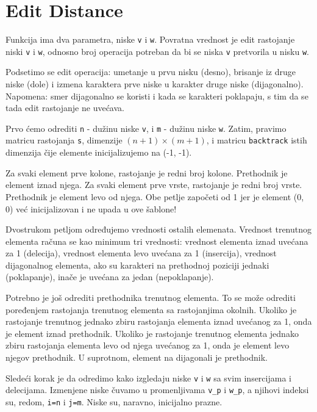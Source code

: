 \section{Edit Distance}

Funkcija ima dva parametra, niske \texttt{v} i \texttt{w}. Povratna vrednost je edit rastojanje niski \texttt{v} i \texttt{w}, odnosno broj operacija potreban da bi se niska \texttt{v} pretvorila u nisku \texttt{w}.

Podsetimo se edit operacija: umetanje u prvu nisku (desno), brisanje iz druge niske (dole) i izmena karaktera prve niske u karakter druge niske (dijagonalno). Napomena: smer dijagonalno se koristi i kada se karakteri poklapaju, s tim da se tada edit rastojanje ne uvećava.

Prvo ćemo odrediti \texttt{n} - dužinu niske \texttt{v}, i \texttt{m} - dužinu niske \texttt{w}. Zatim, pravimo matricu rastojanja \texttt{s}, dimenzije $(n+1) \times (m+1)$, i matricu \texttt{backtrack} istih dimenzija čije elemente inicijalizujemo na (-1, -1). 

Za svaki element prve kolone, rastojanje je redni broj kolone. Prethodnik je element iznad njega. Za svaki element prve vrste, rastojanje je redni broj vrste. Prethodnik je element levo od njega. Obe petlje započeti od 1 jer je element (0, 0) već inicijalizovan i ne upada u ove šablone!

Dvostrukom petljom određujemo vrednosti ostalih elemenata. Vrednost trenutnog elementa računa se kao minimum tri vrednosti: vrednost elementa iznad uvećana za 1 (delecija), vrednost elementa levo uvećana za 1 (insercija), vrednost dijagonalnog elementa, ako su karakteri na prethodnoj poziciji jednaki (poklapanje), inače je uvećana za jedan (nepoklapanje). 

Potrebno je još odrediti prethodnika trenutnog elementa. To se može odrediti poređenjem rastojanja trenutnog elementa sa rastojanjima okolnih. Ukoliko je rastojanje trenutnog jednako zbiru rastojanja elementa iznad uvećanog za 1, onda je element iznad prethodnik. Ukoliko je rastojanje trenutnog elementa jednako zbiru rastojanja elementa levo od njega uvećanog za 1, onda je element levo njegov prethodnik. U suprotnom, element na dijagonali je prethodnik.


Sledeći korak je da odredimo kako izgledaju niske \texttt{v} i \texttt{w} sa svim insercijama i delecijama. Izmenjene niske čuvamo u promenljivama \texttt{v\_p} i \texttt{w\_p}, a njihovi indeksi su, redom, \texttt{i=n} i \texttt{j=m}. Niske su, naravno, inicijalno prazne.

